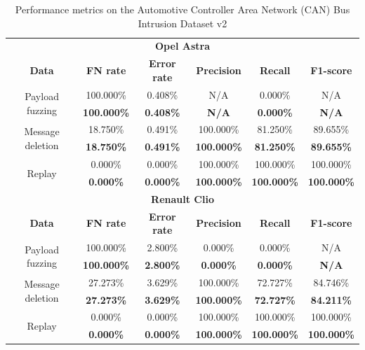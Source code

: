 \begin{table}
    \centering
    \begin{tabular}{*{6}{c}}
        \toprule
        \multicolumn{6}{c}{\textbf{Opel Astra}}\\
        \textbf{Data} & \textbf{FN rate} & \textbf{Error rate} & \textbf{Precision} & \textbf{Recall} & \textbf{F1-score}\\
        \midrule
        \multirow{2}{*}{Payload fuzzing} & 100.000\% & 0.408\% & N/A & 0.000\% & N/A\\
        & \textbf{100.000\%} & \textbf{0.408\%} &  \textbf{N/A} & \textbf{0.000\%} & \textbf{N/A}\\
        \multirow{2}{*}{Message deletion} & 18.750\% & 0.491\% & 100.000\% & 81.250\% & 89.655\%\\
        & \textbf{18.750\%} & \textbf{0.491\%} & \textbf{100.000\%} & \textbf{81.250\%} & \textbf{89.655\%}\\
        \multirow{2}{*}{Replay} & 0.000\% & 0.000\% & 100.000\% & 100.000\% & 100.000\%\\
        & \textbf{0.000\%} & \textbf{0.000\%} & \textbf{100.000\%} & \textbf{100.000\%} & \textbf{100.000\%}\\
        \bottomrule
        \toprule
        \multicolumn{6}{c}{\textbf{Renault Clio}}\\
        \textbf{Data} & \textbf{FN rate} & \textbf{Error rate} & \textbf{Precision} & \textbf{Recall} & \textbf{F1-score}\\
        \midrule
        \multirow{2}{*}{Payload fuzzing} & 100.000\% & 2.800\% & 0.000\% & 0.000\% & N/A\\
        & \textbf{100.000\%} & \textbf{2.800\%} & \textbf{0.000\%} & \textbf{0.000\%} & \textbf{N/A}\\
        \multirow{2}{*}{Message deletion} & 27.273\% & 3.629\% & 100.000\% & 72.727\% & 84.746\%\\
        & \textbf{27.273\%} & \textbf{3.629\%} & \textbf{100.000\%} & \textbf{72.727\%} & \textbf{84.211\%}\\
        \multirow{2}{*}{Replay} & 0.000\% & 0.000\% & 100.000\% & 100.000\% & 100.000\%\\
        & \textbf{0.000\%} & \textbf{0.000\%} & \textbf{100.000\%} & \textbf{100.000\%} & \textbf{100.000\%}\\
        \bottomrule
    \end{tabular}
    \caption{Performance metrics on the Automotive Controller Area Network (CAN) Bus Intrusion Dataset v2}
    \label{tab:perf_tue}
\end{table}

